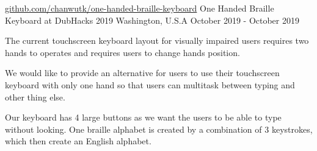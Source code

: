 \begin{cventries}
    \cventry
    {\href{http://github.com/chanwutk/one-handed-braille-keyboard}{github.com/chanwutk/one-handed-braille-keyboard}} %
    {One Handed Braille Keyboard at DubHacks 2019} %
    {Washington, U.S.A} %
    {October 2019 - October 2019} %
    {
      \begin{cvitems} %
        \item {
          The current touchscreen keyboard layout for visually impaired users requires two hands to operates and requires users to change hands position.
        }
        \item {
          We would like to provide an alternative for users to use their touchscreen keyboard with only one hand so that users can multitask between typing and other thing else.
        }
        \item {
          Our keyboard has 4 large buttons as we want the users to be able to type without looking.
          One braille alphabet is created by a combination of 3 keystrokes, which then create an English alphabet.
        }
      \end{cvitems}
    }

\end{cventries}
